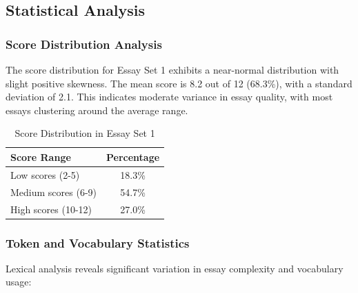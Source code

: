﻿\documentclass[12pt,a4paper]{article}
\begin{document}

\subsection{Statistical Analysis}

\subsubsection{Score Distribution Analysis}
The score distribution for Essay Set 1 exhibits a near-normal distribution with slight positive skewness. The mean score is 8.2 out of 12 (68.3\%), with a standard deviation of 2.1. This indicates moderate variance in essay quality, with most essays clustering around the average range.

\begin{table}[H]
\centering
\caption{Score Distribution in Essay Set 1}
\begin{tabular}{lc}
\toprule
\textbf{Score Range} & \textbf{Percentage} \\
\midrule
Low scores (2-5) & 18.3\% \\
Medium scores (6-9) & 54.7\% \\
High scores (10-12) & 27.0\% \\
\bottomrule
\end{tabular}
\end{table}

\subsubsection{Token and Vocabulary Statistics}
Lexical analysis reveals significant variation in essay complexity and vocabulary usage:
\end{document}
